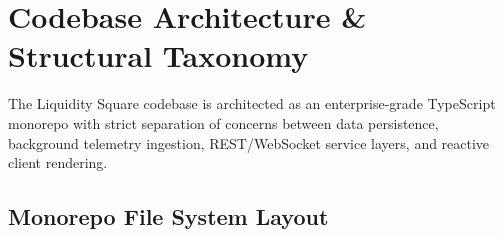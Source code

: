 \documentclass[11pt,a4paper]{article}
\begin{document}
\section{Codebase Architecture \& Structural Taxonomy}

The Liquidity Square codebase is architected as an enterprise-grade TypeScript monorepo with strict separation of concerns between data persistence, background telemetry ingestion, REST/WebSocket service layers, and reactive client rendering.

\subsection{Monorepo File System Layout}
\end{document}

